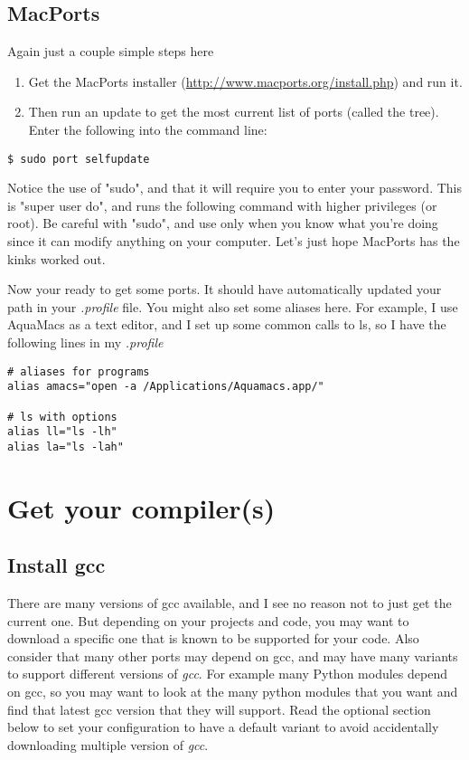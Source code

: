 \documentclass[11pt]{article}
\begin{document}
\subsection{MacPorts}
Again just a couple simple steps here
\begin{enumerate}
	\item Get the MacPorts installer (\url{http://www.macports.org/install.php}) and run it. 
	\item Then run an update to get the most current list of ports (called the tree). Enter the following into the command line:
\end{enumerate}
\begin{lstlisting}[style=Bash]
$ sudo port selfupdate
\end{lstlisting}
Notice the use of "sudo", and that it will require you to enter your password. This is "super user do", and runs the following command with higher privileges (or root). Be careful with "sudo", and use only when you know what you're doing since it can modify anything on your computer. Let's just hope MacPorts has the kinks worked out.

Now your ready to get some ports. It should have automatically updated your path in your \textit{.profile} file. You might also set some aliases here.  For example, I use AquaMacs as a text editor, and I set up some common calls to ls, so I have the following lines in my \textit{.profile}
\begin{lstlisting}[backgroundcolor=\color{light-gray},basicstyle=\ttfamily,xleftmargin=.25in,xrightmargin=.25in]
# aliases for programs
alias amacs="open -a /Applications/Aquamacs.app/"

# ls with options
alias ll="ls -lh"
alias la="ls -lah"
\end{lstlisting}



%
%
\section{Get your compiler(s)}
\subsection{Install gcc}
There are many versions of gcc available, and I see no reason not to just get the current one. But depending on your projects and code, you may want to download a specific one that is known to be supported for your code. Also consider that many other ports may depend on gcc, and may have many variants to support different versions of \textit{gcc}. For example many Python modules depend on gcc, so you may want to look at the many python modules that you want and find that latest gcc version that they will support. Read the optional section below to set your configuration to have a default variant to avoid accidentally downloading multiple version of \textit{gcc}. 
\end{document}
